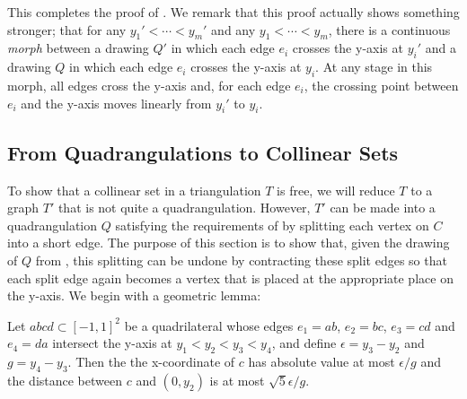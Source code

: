 \documentclass{patmorin}
\begin{document}
This completes the proof of .  We remark that this proof
actually shows something stronger; that for any $y_1'<\cdots<y_m'$ and
any $y_1<\cdots<y_m$, there is a continuous \emph{morph} \cite{x,y,z,w}
between a drawing $Q'$ in which each edge $e_i$ crosses the y-axis at
$y_i'$ and a drawing $Q$ in which each edge $e_i$ crosses the y-axis
at $y_i$.  At any stage in this morph, all edges cross the y-axis and,
for each edge $e_i$, the crossing point between $e_i$ and the y-axis
moves linearly from $y_i'$ to $y_i$.

\subsection{From Quadrangulations to Collinear Sets}

To show that a collinear set in a triangulation $T$ is free, we will
reduce $T$ to a graph $T'$ that is not quite a quadrangulation.  However,
$T'$ can be made into a quadrangulation $Q$ satisfying the requirements
of  by splitting each vertex on $C$ into a short edge. The
purpose of this section is to show that, given the drawing of $Q$ from
, this splitting can be undone by contracting these split
edges so that each split edge again becomes a vertex that is placed at
the appropriate place on the y-axis.  We begin with a geometric lemma:

\begin{lem}
  Let $abcd\subset[-1,1]^2$ be a quadrilateral whose edges
  $e_1=ab$, $e_2=bc$, $e_3=cd$ and $e_4=da$ intersect the y-axis at
  $y_1<y_2<y_3<y_4$, and define $\epsilon=y_3-y_2$ and $g=y_4-y_3$.  Then
  the the x-coordinate of $c$ has absolute value at most $\epsilon/g$ and
  the distance between $c$ and $(0,y_2)$ is at most $\sqrt{5}\epsilon/g$.
\end{lem}
\end{document}

